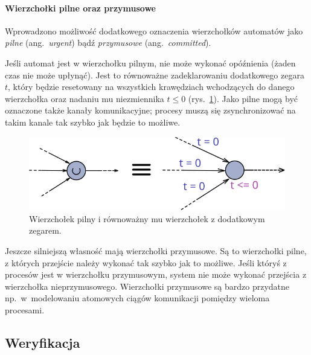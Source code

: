 \documentclass{pracamgr}
\newcommand{\ang}[1]{(ang.~\emph{#1})}
\newcommand{\imgr}[1]{rys.~\ref{#1}}
\theoremstyle{plain}
\begin{document}
\paragraph{Wierzchołki pilne oraz przymusowe} Wprowadzono możliwość
dodatkowego oznaczenia wierzchołków automatów jako \emph{pilne}
\ang{urgent} bądź \emph{przymusowe} \ang{committed}.

Jeśli automat jest w wierzchołku pilnym, nie może wykonać opóźnienia
(żaden czas nie może upłynąć). Jest to równoważne zadeklarowaniu
dodatkowego zegara $t$, który będzie resetowany na wszystkich
krawędziach wchodzących do danego wierzchołka oraz nadaniu mu
niezmiennika $t \leq 0$ (\imgr{img:uppaal-urgent}). Jako pilne mogą być
oznaczone także kanały komunikacyjne; procesy muszą się
zsynchronizować na takim kanale tak szybko jak będzie to możliwe.

\begin{figure}[h]
  \centering
  \includegraphics[width=.5\textwidth]{img/uppaal-urgent}
  \caption{Wierzchołek pilny i równoważny mu wierzchołek z dodatkowym
    zegarem.}
  \label{img:uppaal-urgent}
\end{figure}

Jeszcze silniejszą własność mają wierzchołki przymusowe. Są to
wierzchołki pilne, z których przejście należy wykonać tak szybko jak
to możliwe. Jeśli któryś z procesów jest w wierzchołku przymusowym,
system nie może wykonać przejścia z wierzchołka nieprzymusowego.
Wierzchołki przymusowe są bardzo przydatne np.~w~modelowaniu atomowych
ciągów komunikacji pomiędzy wieloma procesami.

\subsection{Weryfikacja}
\end{document}

